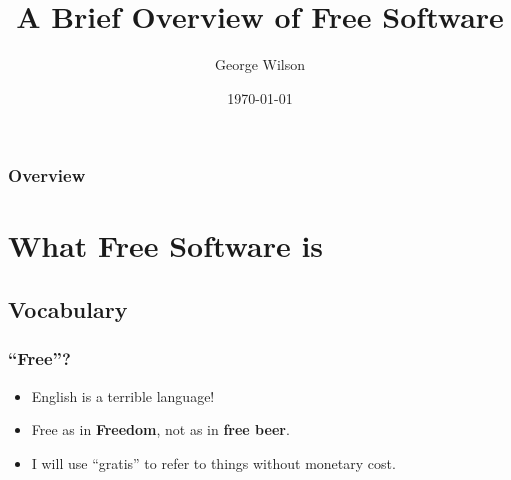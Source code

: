 \documentclass{beamer}
\title[Free Software]{A Brief Overview of Free Software} %
\author{George Wilson} %
\institute[Griffith University] %
{
Griffith University \\ %
\medskip
\href{http://www.github.com/gwils}{www.github.com/gwils} \\
\href{http://www.twitter.com/GeorgeTalksCode}{@GeorgeTalksCode} %
}
\date{\today} %
\begin{document}
\begin{frame}
\titlepage %
\end{frame}

\begin{frame}
\frametitle{Overview} %
\tableofcontents %
\end{frame}


\section{What Free Software is} %

\subsection{Vocabulary} %

\begin{frame}
\frametitle{``Free''?}
\begin{itemize}
\item<+-> English is a terrible language!
\item<+-> Free as in {\bf Freedom}, not as in {\bf free beer}.
\item<+-> I will use ``gratis'' to refer to things without monetary cost.
\end{itemize}

\end{frame}
\end{document}
